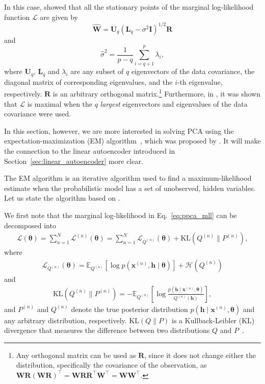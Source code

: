 \documentclass{now}
\newcommand{\vect}[1]{\mathbf{#1}}
\newcommand{\vects}[1]{\boldsymbol{#1}}
\newcommand{\matr}[1]{\mathbf{#1}}
\newcommand{\vh}[0]{\vect{h}}
\newcommand{\vx}[0]{\vect{x}}
\newcommand{\mW}[0]{\matr{W}}
\newcommand{\mU}[0]{\matr{U}}
\newcommand{\mR}[0]{\matr{R}}
\newcommand{\mI}{\matr{I}}
\newcommand{\mL}{\matr{L}}
\newcommand{\TT}[0]{{\vects{\theta}}}
\newcommand{\LL}[0]{\mathcal{L}}
\newcommand{\HH}[0]{\mathcal{H}}
\newcommand{\KL}[0]{\text{KL}}
\newcommand{\E}[0]{\mathbb{E}}
\begin{document}
In this case, \citet{Tipping1999} showed that all the stationary points of the
marginal log-likelihood function $\LL$ are given by
\[
\hat{\mW} = \mU_q \left( \mL_q - \sigma^2 \mI \right)^{1/2}
\mR
\]
and
\[
\hat{\sigma}^2 = \frac{1}{p - q} \sum_{i=q+1}^p \lambda_i,
\]
where $\mU_q$, $\mL_q$ and $\lambda_i$ are any subset of $q$ eigenvectors of the
data covariance, the diagonal matrix of corresponding eigenvalues, and the
$i$-th eigenvalue, respectively. $\mR$ is an arbitrary orthogonal
matrix.\footnote{
Any orthogonal matrix can be used as $\mR$, since it does not change either the
distribution, specifically the covariance of the observation, as
$\mW\mR\left( \mW\mR\right)^\top = \mW\mR \mR^\top \mW^\top = \mW\mW^\top$.
}
Furthermore, in \citep{Tipping1999}, it was shown that $\LL$ is maximal when the
$q$ \textit{largest} eigenvectors and eigenvalues of the data covariance were
used.

In this section, however, we are more interested in solving PCA using the
expectation-maximization (EM)
algorithm~\citep{Dempster1977}, which was proposed by \citet{Roweis1998}.  It
will make the connection to the linear autoencoder introduced in
Section~\ref{sec:linear_autoencoder} more clear.

The EM algorithm is an iterative algorithm used to find a maximum-likelihood
estimate when the probabilistic model has a set of unobserved, hidden variables.
Let us state the algorithm based on \citep{Neal1999,Bishop2006}.

We first note that the marginal log-likelihood in Eq.~\eqref{eq:ppca_mll} can be
decomposed into
\begin{align}
    \label{eq:mll_decom}
    \LL(\TT) = \sum_{n=1}^N \LL^{(n)}(\TT) = \sum_{n=1}^N
    \LL_{Q^{(n)}}(\TT) + \KL(Q^{(n)} \| P^{(n)}),
\end{align}
where
\begin{align}
    \label{eq:mll_post}
    \LL_{Q^{(n)}}(\TT) = \E_{Q^{(n)}} \left[ \log
    p(\vx^{(n)}, \vh \mid
    \TT)\right] + \HH(Q^{(n)})
\end{align}
and
\begin{align}
    \label{eq:kldiv}
    \KL(Q^{(n)} \| P^{(n)}) = -\E_{Q^{(n)}} \left[ \log
    \frac{p(\vh \mid \vx^{(n)},
    \TT)}{Q^{(n)}(\vh)} \right],
\end{align}
and $P^{(n)}$ and $Q^{(n)}$ denote the true posterior distribution $p(\vh \mid
\vx^{(n)}, \TT)$ and any arbitrary distribution, respectively. $\KL(Q \| P)$ is
a Kullback-Leibler (KL) divergence
that measures the difference between two distributions $Q$ and
$P$~\citep{Kullback1951}.
\end{document}
